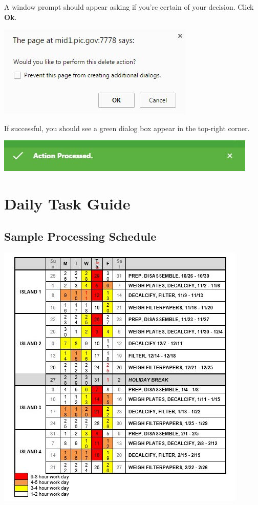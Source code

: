 \documentclass[
]{book}
\begin{document}
A window prompt should appear asking if you're certain of your decision. Click \textbf{Ok}.

\includegraphics{images/Data24.jpg}

If successful, you should see a green dialog box appear in the top-right corner.

\includegraphics{images/Data25.jpg}

\hypertarget{daily-task-guide}{%
\section{Daily Task Guide}\label{daily-task-guide}}

\hypertarget{sample-processing-schedule}{%
\subsection{Sample Processing Schedule}\label{sample-processing-schedule}}

\includegraphics{images/DailyTasks1.jpg}
\end{document}
